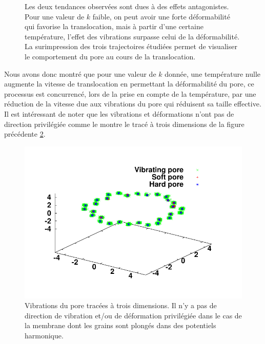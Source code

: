 \begin{figure}[H]
\begin{minipage}{0.63\linewidth}
\end{minipage}
\begin{minipage}{0.37\linewidth} 
\caption[Antagonisme des effets observés]{Les deux tendances observées sont dues à des effets antagonistes. Pour une valeur de $k$ faible, on peut avoir une forte déformabilité qui favorise la translocation, mais à partir d'une certaine température, l'effet des vibrations surpasse celui de la déformabilité. La surimpression des trois trajectoires étudiées permet de visualiser le comportement du pore au cours de la translocation.}
\label{antagonismesinfluence}
\end{minipage}
\end{figure}

Nous avons donc montré que pour une valeur de $k$ donnée, une température nulle augmente la vitesse de translocation en permettant la déformabilité du pore, ce processus est concurrencé, lors de la prise en compte de la température, par une réduction de la vitesse due aux vibrations du pore qui réduisent sa taille effective. Il est intéressant de noter que les vibrations et déformations n'ont pas de direction privilégiée comme le montre le tracé à trois dimensions de la figure précédente \ref{3dplotpore}.


\begin{figure}[H]
\begin{center}


\includegraphics[width=1\textwidth]{porearea3d.pdf} 

\caption[Déplacement du pore à trois dimensions]{Vibrations du pore tracées à trois dimensions. Il n'y a pas de direction de vibration et/ou de déformation privilégiée dans le cas de la membrane dont les grains sont plongés dans des potentiels harmonique.}
\label{3dplotpore}
\end{center}
\end{figure}

